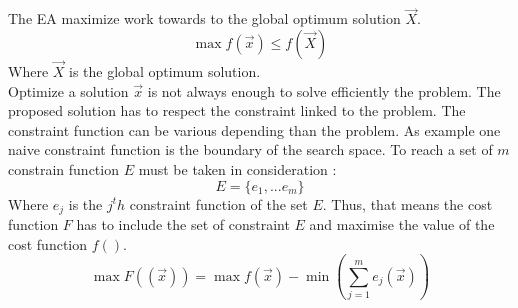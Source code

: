 The EA maximize work towards to the global optimum solution $\vec{X}$.
\begin{equation}
	\max f(\vec{x})\leq f(\vec{X})
\end{equation}
 Where  $\vec{X}$ is the global optimum solution. \\
Optimize a solution $\vec{x}$ is not always enough to solve efficiently the problem. 
The proposed solution has to respect the constraint linked to the problem. The constraint function can be various depending than the problem. As example one naive constraint function is the boundary of the search space. To reach a set of $m$ constrain function $E$ must be taken in consideration :
\begin{equation}
	E= \{e_1,...e_m \} 
\end{equation}
Where $e_j$ is the $j^th$ constraint function of the set $E$. %
Thus, that means the cost function $F$ has to include  the set of constraint $E$ and maximise the value of the cost function $f()$.
\begin{equation}
	\max F((\vec{x}))= \max f(\vec{x}) - \min (\sum^{m}_{j=1} e_j(\vec{x} ) )  
\end{equation}


